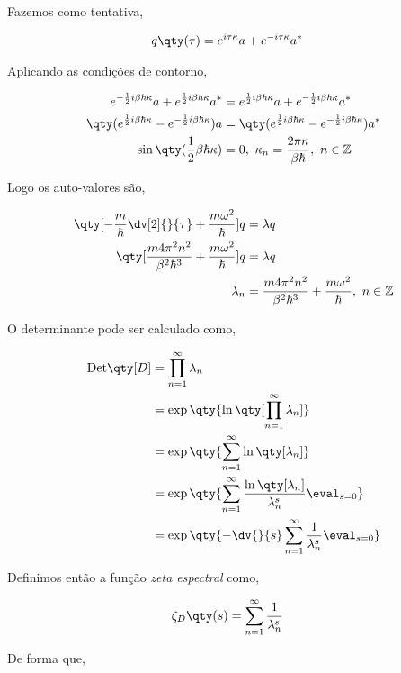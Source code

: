 \documentclass[twoside]{amsart}
\numberwithin{equation}{section}
\newcommand{\Det}[1]{\textup{Det} #1}
\begin{document}
\begin{refsection}
Fazemos como tentativa,

\begin{align}
    q\qty(\tau)&=e^{i\tau\kappa}a+e^{-i\tau\kappa}a^\ast
\end{align}

Aplicando as condições de contorno,

\begin{align}
    e^{-\frac12i\beta\hbar\kappa}a+e^{\frac12i\beta\hbar\kappa}a^\ast&=e^{\frac12i\beta\hbar\kappa}a+e^{-\frac12i\beta\hbar\kappa}a^\ast\\
    \qty(e^{\frac12i\beta\hbar\kappa}-e^{-\frac12i\beta\hbar\kappa})a&=\qty(e^{\frac12i\beta\hbar\kappa}-e^{-\frac12i\beta\hbar\kappa})a^\ast\\
    \sin\qty(\frac12\beta\hbar\kappa)&=0,\ \kappa_n=\frac{2\pi n}{\beta\hbar},\ n\in\mathbb Z
\end{align}

Logo os auto-valores são,

\begin{align}
    \qty[-\frac m\hbar \dv[2]{}{\tau}+\frac{m\omega^2}{\hbar}]q&=\lambda q\\
    \qty[\frac{m4\pi^2n^2}{\beta^2\hbar^3}+\frac{m\omega^2}{\hbar}]q&=\lambda q\\
    \lambda_n&=\frac{m4\pi^2n^2}{\beta^2\hbar^3}+\frac{m\omega^2}{\hbar},\ n\in\mathbb Z
\end{align}

O determinante pode ser calculado como,

\begin{align}
    \Det\qty[D]&=\prod\limits_{n=1}^{\infty}\lambda_n\\
    &=\exp\qty{\ln\qty[\prod\limits_{n=1}^{\infty}\lambda_n]}\\
    &=\exp\qty{\sum\limits_{n=1}^{\infty}\ln\qty[\lambda_n]}\\
    &=\exp\qty{\sum\limits_{n=1}^{\infty}\frac{\ln\qty[\lambda_n]}{\lambda_n^s}\eval_{s=0}}\\
    &=\exp\qty{-\dv{}{s}\sum\limits_{n=1}^{\infty}\frac{1}{\lambda_n^s}\eval_{s=0}}
\end{align}

Definimos então a função \emph{zeta espectral} como,

\begin{align}
    \zeta_D\qty(s)&=\sum\limits_{n=1}^{\infty}\frac{1}{\lambda_n^s}
\end{align}

De forma que,


\end{refsection}
\end{document}
